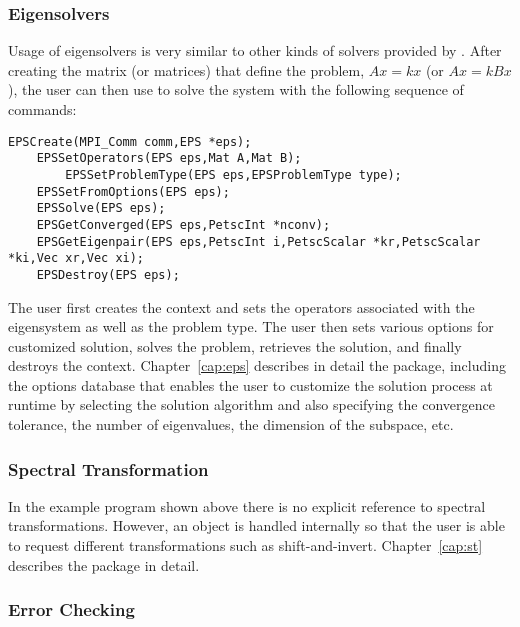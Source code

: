 \subsubsection*{Eigensolvers}

Usage of eigensolvers is very similar to other kinds of solvers provided by \petsc. After creating the matrix (or matrices) that define the problem, $Ax = kx$ (or $Ax=kBx$), the user can then use  to solve the system with the following sequence of commands: 
  
  
 
	\begin{Verbatim}[fontsize=\small,numbers=none]
	EPSCreate(MPI_Comm comm,EPS *eps);
	EPSSetOperators(EPS eps,Mat A,Mat B);
        EPSSetProblemType(EPS eps,EPSProblemType type);
	EPSSetFromOptions(EPS eps);
	EPSSolve(EPS eps);
	EPSGetConverged(EPS eps,PetscInt *nconv);
	EPSGetEigenpair(EPS eps,PetscInt i,PetscScalar *kr,PetscScalar *ki,Vec xr,Vec xi);
	EPSDestroy(EPS eps);
	\end{Verbatim} 
The user first creates the  context and sets the operators associated with the eigensystem as well as the problem type. The user then sets various options for customized solution, solves the problem, retrieves the solution, and finally destroys the  context. Chapter~\ref{cap:eps} describes in detail the  package, including
the options database that enables the user to customize the solution process at runtime by selecting the solution algorithm and also specifying the convergence tolerance, the number of eigenvalues, the dimension of the subspace, etc.

\subsubsection*{Spectral Transformation}

In the example program shown above there is no explicit reference to spectral transformations. However, an  object is handled internally so that the user is able to request different transformations such as shift-and-invert. Chapter~\ref{cap:st} describes the  package in detail.

\subsubsection*{Error Checking}

